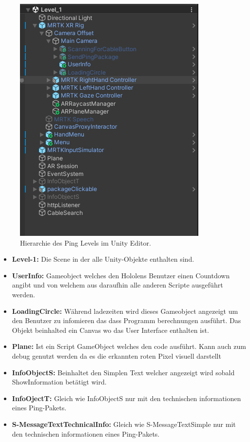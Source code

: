 \begin{figure}[h]
    \centering
    \includegraphics[scale=1]{images/Level1Hierarchy.png}
    \caption{Hierarchie des Ping Levels im Unity Editor.}
    \label{fig:level1_hierarchy}
\end{figure}
\begin{itemize}
    \item \textbf{Level-1:} Die Scene in der alle Unity-Objekte enthalten sind.
    \item \textbf{UserInfo:} Gameobject welches den Hololens Benutzer einen Countdown angibt und von welchem aus
    daraufhin alle anderen Scripte ausgeführt werden.
    \item \textbf{LoadingCircle:} Während ladezeiten wird dieses Gameobject angezeigt um den Benutzer zu infomieren das
    dass Programm berechnungen ausführt. Das Objekt beinhalted ein Canvas wo das User Interface enthalten ist.
    \item \textbf{Plane:} Ist ein Script GameObject welches den code ausführt. Kann auch zum debug genutzt werden da es
    die erkannten roten Pixel visuell darstellt
    \item \textbf{InfoObjectS:} Beinhaltet den Simplen Text welcher angezeigt wird sobald ShowInformation betätigt wird.
    \item \textbf{InfoOjectT:} Gleich wie InfoObjectS nur mit den technischen informationen eines Ping-Pakets.
    \item \textbf{S-MessageTextTechnicalInfo:} Gleich wie S-MessageTextSimple nur mit den technischen informationen
     eines Ping-Pakets.
\end{itemize}

